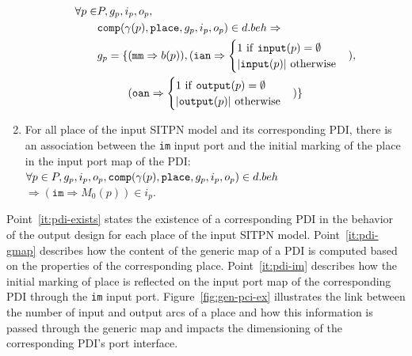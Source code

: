\begin{definition}
\begin{enumerate}[resume]
    \begin{equation*}
      \begin{aligned}
        \forall{}p\in&{}P,g_p,i_p,o_p, \\
        & \mathtt{comp}(\gamma(p),\mathtt{place},g_p,i_p,o_p)\in{}d.beh\Rightarrow \\
        &
          \begin{aligned}
            g_p=\{&(\mathtt{mm}\Rightarrow{}b(p)), (\mathtt{ian}\Rightarrow
            \begin{cases}
              1~\mathrm{if}~\mathtt{input}(p)=\emptyset \\
              \vert{}\mathtt{input}(p)\vert~\mathrm{otherwise} \\
            \end{cases}), \\
            &(\mathtt{oan}\Rightarrow
            \begin{cases}
              1~\mathrm{if}~\mathtt{output}(p)=\emptyset \\
              \vert{}\mathtt{output}(p)\vert~\mathrm{otherwise} \\
            \end{cases})\} \\
          \end{aligned}
        \\
      \end{aligned}
    \end{equation*}
    
  \item\label{it:pdi-im} For all place of the input SITPN model and
    its corresponding PDI, there is an association between the
    \texttt{im} input port and the initial marking of the place in the
    input port map of the PDI:\\
    $\forall{}p\in{}P,g_p,i_p,o_p,\mathtt{comp}(\gamma(p),\mathtt{place},g_p,i_p,o_p)\in{}d.beh{}$
    $\Rightarrow(\mathtt{im}\Rightarrow{}M_0(p))\in{}i_p$.
  \end{enumerate}

  \bigskip

  Point~\ref{it:pdi-exists} states the existence of a corresponding
  PDI in the behavior of the output design for each place of the input
  SITPN model. Point~\ref{it:pdi-gmap} describes how the content of
  the generic map of a PDI is computed based on the properties of the
  corresponding place. Point~\ref{it:pdi-im} describes how the initial
  marking of place is reflected on the input port map of the
  corresponding PDI through the \texttt{im} input
  port. Figure~\ref{fig:gen-pci-ex} illustrates the link between the
  number of input and output arcs of a place and how this information
  is passed through the generic map and impacts the dimensioning of
  the corresponding PDI's port interface.


\end{definition}
